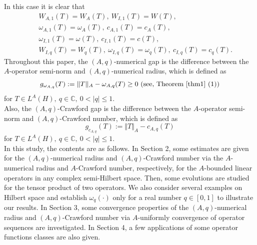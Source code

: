 \documentclass[preprint,12pt,3p]{elsarticle}
\begin{document}
In this case it is clear that
\begin{eqnarray}
& & W_{A,1}(T)=W_{A}(T), \ W_{I,1}(T)=W(T), \nonumber \\
& & \omega_{A,1}(T)=\omega_{A}(T), \ c_{A,1}(T)=c_{A}(T), \nonumber \\
& & \omega_{I,1}(T)=\omega(T), \ c_{I,1}(T)=c(T), \nonumber \\
& & W_{I,q}(T)=W_{q}(T), \ \omega_{I,q}(T)=\omega_{q}(T), \ c_{I,q}(T)=c_{q}(T). \nonumber 
\end{eqnarray}
Throughout this paper, the $ (A,q)$-numerical gap is the difference between the $ A $-operator semi-norm and $ (A,q) $-numerical radius, which is defined as 
$$
g_{\omega_{A,q}}(T):=\Vert T \Vert_{A} - \omega_{A,q}(T)\geq 0 \ \text{(see, Theorem \ref{thm1} (1))}
$$
for $ T\in L^{A}(H), \ q\in \mathbb{C}, \ 0< \vert q \vert \leq 1. $ \\
Also, the $ (A,q) $-Crawford gap is the difference between the $ A $-operator semi-norm and $ (A,q) $-Crawford number, which is defined as 
$$
g_{c_{A,q}}(T):=\Vert T \Vert_{A} - c_{A,q}(T)
$$
for $ T\in L^{A}(H), \ q\in \mathbb{C}, \ 0< \vert q \vert \leq 1. $ \\
In this study, the contents are as follows. In Section 2, some estimates are given for the $ (A,q) $-numerical radius and $ (A,q) $-Crawford number via the $ A $-numerical radius and $ A$-Crawford number, respectively, for the $ A $-bounded linear operators in any complex semi-Hilbert space. Then, some evolutions are studied for the tensor product of two operators. We also consider several examples on Hilbert space and establish $\omega_q(\cdot)$ only for a real number $q\in [0, 1]$ to illustrate our results. In Section 3, some convergence properties of the $ (A,q) $-numerical radius and $ (A,q) $-Crawford number via $ A $-uniformly convergence of operator sequences are investigated. In Section 4, a few applications of some operator functions classes are also given.

\setcounter{section}{2}
\end{document}
